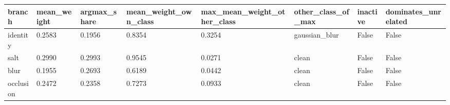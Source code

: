 \begin{tabular}{llllllll}
\hline
branch & mean\_weight & argmax\_share & mean\_weight\_own\_class & max\_mean\_weight\_other\_class & other\_class\_of\_max & inactive & dominates\_unrelated \\
\hline
identity & 0.2583 & 0.1956 & 0.8354 & 0.3254 & gaussian\_blur & False & False \\
salt & 0.2990 & 0.2993 & 0.9545 & 0.0271 & clean & False & False \\
blur & 0.1955 & 0.2693 & 0.6189 & 0.0442 & clean & False & False \\
occlusion & 0.2472 & 0.2358 & 0.7273 & 0.0933 & clean & False & False \\
\hline
\end{tabular}
